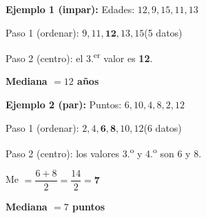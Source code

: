 \documentclass[12pt, letterpaper]{article}
\begin{document}
	\begin{ejemplo}
		\textbf{Ejemplo 1 (impar):}
		Edades: $12, 9, 15, 11, 13$
		
		Paso 1 (ordenar): $9, 11, \mathbf{12}, 13, 15$\quad (5 datos)
		
		Paso 2 (centro): el 3.\textsuperscript{er} valor es \textbf{12}.
		
		\textbf{Mediana $= 12$ años}
		
		\vspace{0.3cm}
		\textbf{Ejemplo 2 (par):}
		Puntos: $6, 10, 4, 8, 2, 12$
		
		Paso 1 (ordenar): $2, 4, \mathbf{6, 8}, 10, 12$\quad (6 datos)
		
		Paso 2 (centro): los valores 3.\textsuperscript{o} y 4.\textsuperscript{o} son 6 y 8.
		
		Me $= \dfrac{6+8}{2} = \dfrac{14}{2} = \mathbf{7}$
		
		\textbf{Mediana $= 7$ puntos}
	\end{ejemplo}
	
\end{document}
